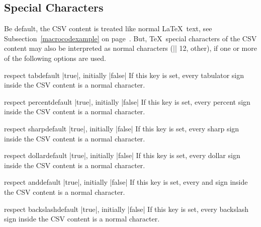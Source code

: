 \documentclass[a4paper,11pt]{ltxdoc}
\begin{document}
\clearpage
\subsection{Special Characters}\label{subsec:specchar}
Be default, the CSV content is treated like normal \LaTeX\ text, see
Subsection~\ref{macrocodexample} on page~\pageref{macrocodexample}.
But, \TeX\ special characters of the CSV content may also be interpreted
as normal characters (|\catcode| 12, other), if one or more of the following options are used.

\begin{docCsvKey}{respect tab}{}{default |true|, initially |false|}
  If this key is set, every
  tabulator sign
  inside the CSV content is a normal character.
\end{docCsvKey}

\begin{docCsvKey}{respect percent}{}{default |true|, initially |false|}
  If this key is set, every
  percent sign \verbbox{\%}
  inside the CSV content is a normal character.
\end{docCsvKey}

\begin{docCsvKey}{respect sharp}{}{default |true|, initially |false|}
  If this key is set, every
  sharp sign \verbbox{\#}
  inside the CSV content is a normal character.
\end{docCsvKey}

\begin{docCsvKey}{respect dollar}{}{default |true|, initially |false|}
  If this key is set, every
  dollar sign \verbbox{\$}
  inside the CSV content is a normal character.
\end{docCsvKey}

\begin{docCsvKey}{respect and}{}{default |true|, initially |false|}
  If this key is set, every
  and sign \verbbox{\&}
  inside the CSV content is a normal character.
\end{docCsvKey}

\begin{docCsvKey}{respect backslash}{}{default |true|, initially |false|}
  If this key is set, every
  backslash sign \verbbox{\textbackslash}
  inside the CSV content is a normal character.
\end{docCsvKey}
\end{document}
